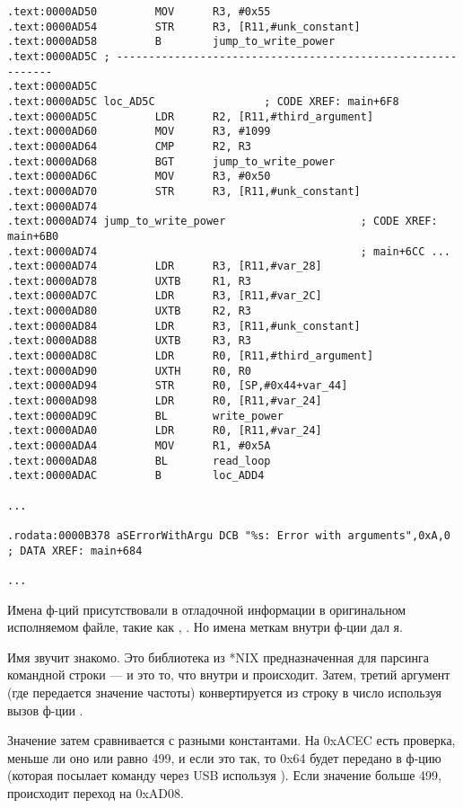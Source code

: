 \begin{lstlisting}[style=customasmARM]
.text:0000AD50         MOV      R3, #0x55
.text:0000AD54         STR      R3, [R11,#unk_constant]
.text:0000AD58         B        jump_to_write_power
.text:0000AD5C ; ------------------------------------------------------------
.text:0000AD5C
.text:0000AD5C loc_AD5C                 ; CODE XREF: main+6F8
.text:0000AD5C         LDR      R2, [R11,#third_argument]
.text:0000AD60         MOV      R3, #1099
.text:0000AD64         CMP      R2, R3
.text:0000AD68         BGT      jump_to_write_power
.text:0000AD6C         MOV      R3, #0x50
.text:0000AD70         STR      R3, [R11,#unk_constant]
.text:0000AD74
.text:0000AD74 jump_to_write_power                     ; CODE XREF: main+6B0
.text:0000AD74                                         ; main+6CC ...
.text:0000AD74         LDR      R3, [R11,#var_28]
.text:0000AD78         UXTB     R1, R3
.text:0000AD7C         LDR      R3, [R11,#var_2C]
.text:0000AD80         UXTB     R2, R3
.text:0000AD84         LDR      R3, [R11,#unk_constant]
.text:0000AD88         UXTB     R3, R3
.text:0000AD8C         LDR      R0, [R11,#third_argument]
.text:0000AD90         UXTH     R0, R0
.text:0000AD94         STR      R0, [SP,#0x44+var_44]
.text:0000AD98         LDR      R0, [R11,#var_24]
.text:0000AD9C         BL       write_power
.text:0000ADA0         LDR      R0, [R11,#var_24]
.text:0000ADA4         MOV      R1, #0x5A
.text:0000ADA8         BL       read_loop
.text:0000ADAC         B        loc_ADD4

...

.rodata:0000B378 aSErrorWithArgu DCB "%s: Error with arguments",0xA,0 ; DATA XREF: main+684

...

\end{lstlisting}

Имена ф-ций присутствовали в отладочной информации в оригинальном исполняемом файле,
такие как , .
Но имена меткам внутри ф-ции дал я.

Имя  звучит знакомо. Это библиотека  из *NIX предназначенная для парсинга командной строки ---
и это то, что внутри и происходит.
Затем, третий аргумент (где передается значение частоты) конвертируется из строку в число используя вызов ф-ции .

Значение затем сравнивается с разными константами.
На 0xACEC есть проверка, меньше ли оно или равно 499, и если это так, то 0x64 будет передано в ф-цию
 (которая посылает команду через USB используя ).
Если значение больше 499, происходит переход на 0xAD08.

